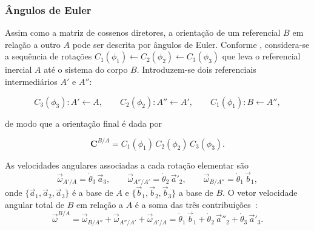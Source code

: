 \subsubsection{Ângulos de Euler}
\label{sec:angulos_euler}

Assim como a matriz de cossenos diretores, a orientação de um referencial $B$
em relação a outro $A$ pode ser descrita por ângulos de Euler.
Conforme \cite{wie2008space}, considera-se a sequência de rotações
$C_1(\phi_1) \leftarrow C_2(\phi_2) \leftarrow C_3(\phi_3)$ que leva o
referencial inercial $A$ até o sistema do corpo $B$. Introduzem-se dois
referenciais intermediários $A'$ e $A''$:

\begin{equation}
C_3(\phi_3): A' \leftarrow A,\qquad
C_2(\phi_2): A'' \leftarrow A',\qquad
C_1(\phi_1): B \leftarrow A'',
\end{equation}

de modo que a orientação final é dada por

\begin{equation}
\mathbf{C}^{B/A}
=
C_1(\phi_1)\,C_2(\phi_2)\,C_3(\phi_3).
\end{equation}

As velocidades angulares associadas a cada rotação elementar são
\begin{equation}
\vec{\omega}_{A'/A} = \dot{\theta}_3\,\vec{a}_3
,\qquad
\vec{\omega}_{A''/A'} = \dot{\theta}_2\,\vec{a}'_2
,\qquad
\vec{\omega}_{B/A''} = \dot{\theta}_1\,\vec{b}_1,
\end{equation}
onde $\{\vec{a}_1,\vec{a}_2,\vec{a}_3\}$ é a base de $A$ e
$\{\vec{b}_1,\vec{b}_2,\vec{b}_3\}$ a base de $B$.
O vetor velocidade angular total de $B$ em relação a $A$ é a soma das três
contribuições~\cite{wie2008space}:
\begin{equation}
\vec{\omega}^{B/A}
=
\vec{\omega}_{B/A''}
+
\vec{\omega}_{A''/A'}
+
\vec{\omega}_{A'/A}
=
\dot{\theta}_1\,\vec{b}_1
+
\dot{\theta}_2\,\vec{a}''_2
+
\dot{\theta}_3\,\vec{a}'_3.
\label{eq:omega_soma_contrib}
\end{equation}

